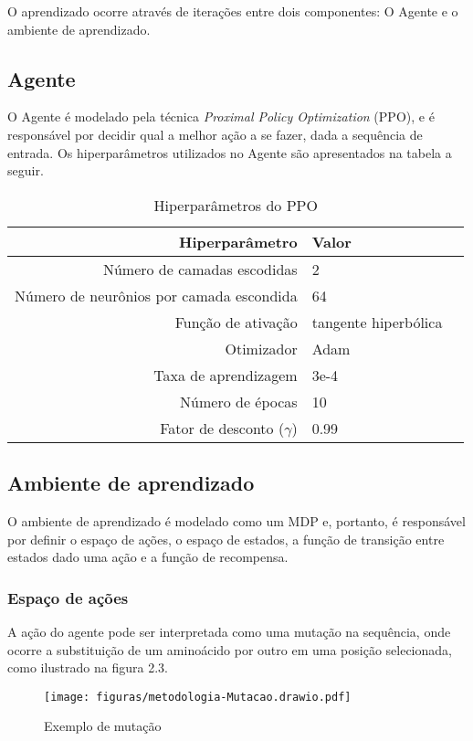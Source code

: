 O aprendizado ocorre através de iterações entre dois componentes: O Agente e o ambiente de aprendizado. 

\subsection{Agente}
O Agente é modelado pela técnica \textit{Proximal Policy Optimization} (PPO), e é responsável por decidir qual a melhor ação a se fazer, dada a sequência de entrada. 
Os hiperparâmetros utilizados no Agente são apresentados na tabela a seguir. 

\begin{table}[H]
\centering
\vspace{0.5cm}
\begin{tabular}{r|lr}
Hiperparâmetro & Valor \\ 
\hline                               %
Número de camadas escodidas & 2 \\
Número de neurônios por camada escondida & 64 \\
Função de ativação & tangente hiperbólica \\
Otimizador & Adam \\
Taxa de aprendizagem & 3e-4 \\
Número de épocas & 10 \\
Fator de desconto ($\gamma$) & 0.99 \\
\end{tabular}
\caption{Hiperparâmetros do PPO}
\end{table}

\subsection{Ambiente de aprendizado}
O ambiente de aprendizado é modelado como um MDP e, portanto, é responsável por definir o espaço de ações, o espaço de estados, a função de transição entre estados dado uma ação e a função de recompensa.  

\subsubsection{Espaço de ações}

A ação do agente pode ser interpretada como uma mutação na sequência, onde ocorre a substituição de um aminoácido por outro em uma posição selecionada, como ilustrado na figura 2.3. 

\begin{figure}[H]
  \centering
  \texttt{[image: figuras/metodologia-Mutacao.drawio.pdf]}
  \caption{Exemplo de mutação}
\end{figure}

